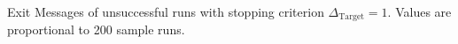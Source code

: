 Exit Messages of unsuccessful runs with stopping criterion $\Delta_{\text{Target}} = 1$. Values are proportional to 200 sample runs.